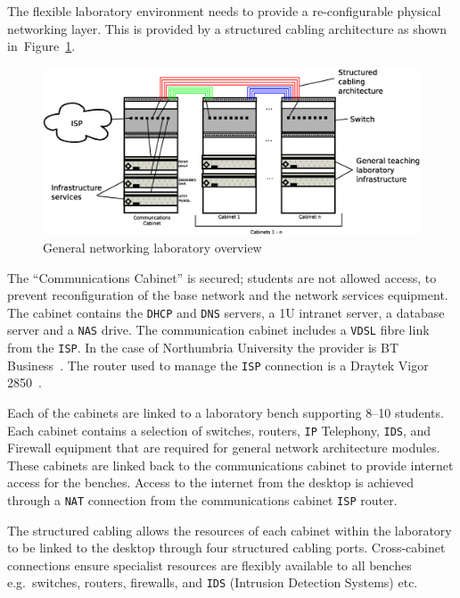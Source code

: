 The flexible laboratory environment needs to provide a re-configurable physical
networking layer. This is provided by a structured cabling architecture as
shown in~Figure~\ref{fig:Overview1}.

\begin{figure}[h]
\begin{center}
	\includegraphics[scale=0.4]{Images/Infrastructure.eps}
\caption{General networking laboratory overview}
\label{fig:Overview1}
\end{center}
\end{figure}

The ``Communications Cabinet'' is secured; students are not allowed access, to
prevent reconfiguration of the base network and the network services equipment.
The cabinet contains the \texttt{DHCP} and \texttt{DNS} servers, a 1U intranet
server, a database server and a \texttt{NAS} drive. The communication cabinet
includes a \texttt{VDSL} fibre link from the \texttt{ISP}. In the case of
Northumbria University the provider is BT Business~\cite{BT:17}. The router
used to manage the \texttt{ISP} connection is a Draytek Vigor
2850~\cite{DC:17}.

Each of the cabinets are linked to a laboratory bench supporting 8--10
students. Each cabinet contains a selection of switches, routers, \texttt{IP}
Telephony, \texttt{IDS}, and Firewall equipment that are required for general
network architecture modules. These cabinets are linked back to the
communications cabinet to provide internet access for the benches. Access to
the internet from the desktop is achieved through a \texttt{NAT} connection
from the communications cabinet \texttt{ISP} router.

The structured cabling allows the resources of each cabinet within the
laboratory to be linked to the desktop through four structured cabling ports.
Cross-cabinet connections ensure specialist resources are flexibly available to
all benches e.g.\ switches, routers, firewalls, and \texttt{IDS} (Intrusion
Detection Systems) etc.

